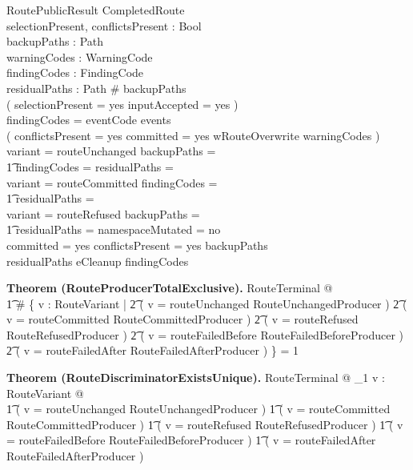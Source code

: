 \documentclass{article}
\makeatletter
\newenvironment{theorem}[1]{\medskip\noindent\textbf{Theorem (#1).}\@nameuse{zed}}{\@nameuse{endzed}}
\makeatother
\begin{document}
\begin{schema}{RoutePublicResult}
	CompletedRoute \\
	selectionPresent, conflictsPresent : Bool \\
	backupPaths : \power Path \\
	warningCodes : \power WarningCode \\
	findingCodes : \power FindingCode \\
	residualPaths : \power Path
	\where
	\# backupPaths  \\
	( selectionPresent = yes \iff inputAccepted = yes ) \\
	findingCodes = eventCode \limg events \rimg \\
	( conflictsPresent = yes \land committed = yes \iff
	wRouteOverwrite \in warningCodes ) \\
	variant = routeUnchanged \implies backupPaths = \emptyset \land \\
	\t1 findingCodes = \emptyset \land residualPaths = \emptyset \\
	variant = routeCommitted \implies findingCodes = \emptyset \land \\
	\t1 residualPaths = \emptyset \\
	variant = routeRefused \implies backupPaths = \emptyset \land \\
	\t1 residualPaths = \emptyset \land namespaceMutated = no \\
	committed = yes \land conflictsPresent = yes \implies backupPaths \neq \emptyset \\
	residualPaths \neq \emptyset \implies eCleanup \in findingCodes
\end{schema}

\begin{theorem}{RouteProducerTotalExclusive}
	\forall RouteTerminal @ \\
	\t1 \# \{ v : RouteVariant |
	\t2 ( v = routeUnchanged \land RouteUnchangedProducer ) \lor
	\t2 ( v = routeCommitted \land RouteCommittedProducer ) \lor
	\t2 ( v = routeRefused \land RouteRefusedProducer ) \lor
	\t2 ( v = routeFailedBefore \land RouteFailedBeforeProducer ) \lor
	\t2 ( v = routeFailedAfter \land RouteFailedAfterProducer ) \} = 1
\end{theorem}

\begin{theorem}{RouteDiscriminatorExistsUnique}
	\forall RouteTerminal @ \exists_1 v : RouteVariant @ \\
	\t1 ( v = routeUnchanged \land RouteUnchangedProducer ) \lor
	\t1 ( v = routeCommitted \land RouteCommittedProducer ) \lor
	\t1 ( v = routeRefused \land RouteRefusedProducer ) \lor
	\t1 ( v = routeFailedBefore \land RouteFailedBeforeProducer ) \lor
	\t1 ( v = routeFailedAfter \land RouteFailedAfterProducer )
\end{theorem}
\end{document}
